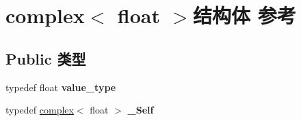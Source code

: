 \hypertarget{structcomplex_3_01float_01_4}{}\section{complex$<$ float $>$结构体 参考}
\label{structcomplex_3_01float_01_4}
\subsection*{Public 类型}
\begin{DoxyCompactItemize}
\item 
\mbox{\label{structcomplex_3_01float_01_4_abaf58b72b356be394781d7f4f8d7a7c2}} 
typedef float {\bfseries value\+\_\+type}
\item 
\mbox{\label{structcomplex_3_01float_01_4_a7c79ab6e495cdb1fc4307284aeb3ba63}} 
typedef \hyperlink{structcomplex}{complex}$<$ float $>$ {\bfseries \+\_\+\+Self}
\end{DoxyCompactItemize}
